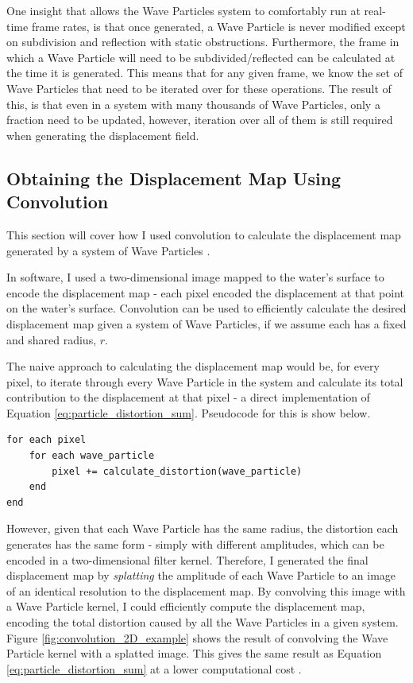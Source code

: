 \documentclass[12pt,a4paper,twoside]{report}
\begin{document}
One insight that allows the Wave Particles system to comfortably run at
real-time frame rates, is that once generated, a Wave Particle is never
modified except on subdivision and reflection with static obstructions.
Furthermore, the frame in which a Wave Particle will need to be
subdivided/reflected can be calculated at the time it is generated. This means
that for any given frame, we know the set of Wave Particles that need to be
iterated over for these operations. The result of this, is that even in a
system with many thousands of Wave Particles, only a fraction need to be
updated, however, iteration over all of them is still required when generating
the displacement field.

\subsection{Obtaining the Displacement Map Using Convolution}
\label{sec:implementation_overview_obtain_displacement_map}

This section will cover how I used convolution to calculate the displacement
map generated by a system of Wave Particles \cite{Yuksel2007}.

In software, I used a two-dimensional image mapped to the water's surface to
encode the displacement map - each pixel encoded the displacement at that point
on the water's surface. Convolution can be used to efficiently calculate the
desired displacement map given a system of Wave Particles, if we assume each
has a fixed and shared radius, $r$.

The naive approach to calculating the displacement map would be, for every
pixel, to iterate through every Wave Particle in the system and calculate its
total contribution to the displacement at that pixel - a direct implementation
of Equation \ref{eq:particle_distortion_sum}. Pseudocode for this is show
below.

\begin{lstlisting}
for each pixel
    for each wave_particle
        pixel += calculate_distortion(wave_particle)
    end
end
\end{lstlisting}

However, given that each Wave Particle has the same radius, the distortion each
generates has the same form - simply with different amplitudes, which can be
encoded in a two-dimensional filter kernel. Therefore, I generated the final
displacement map by \textit{splatting} the amplitude of each Wave Particle to
an image of an identical resolution to the displacement map. By convolving this
image with a Wave Particle kernel, I could efficiently compute the displacement
map, encoding the total distortion caused by all the Wave Particles in a given
system. Figure \ref{fig:convolution_2D_example} shows the result of convolving
the Wave Particle kernel with a splatted image. This gives the same result as
Equation \ref{eq:particle_distortion_sum} at a lower computational cost
\cite{Yuksel2007}.
\end{document}

